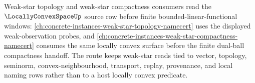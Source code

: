 Weak-star topology and weak-star compactness consumers read the $\LocallyConvexSpaceUp$ source row before finite bounded-linear-functional windows: \autoref{ch:concrete-instances-weak-star-topology-namecert} uses the displayed weak-observation probes, and \autoref{ch:concrete-instances-weak-star-compactness-namecert} consumes the same locally convex surface before the finite dual-ball compactness handoff. The route keeps weak-star reads tied to vector, topology, seminorm, convex-neighbourhood, transport, replay, provenance, and local naming rows rather than to a host locally convex predicate.
